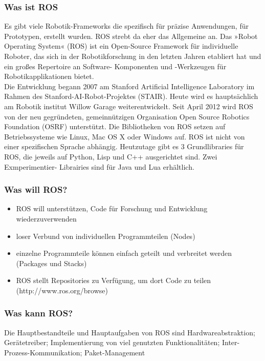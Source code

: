 \subsubsection{Was ist ROS}
Es gibt viele Robotik-Frameworks die spezifisch für präzise Anwendungen, für Prototypen,
erstellt wurden. ROS strebt da eher das Allgemeine an. Das »Robot Operating System«
(ROS) ist ein Open-Source Framework für individuelle Roboter, das sich in der
Robotikforschung in den letzten Jahren etabliert hat und ein großes Repertoire an Software-
Komponenten und -Werkzeugen für Robotikapplikationen bietet.\\
Die Entwicklung begann 2007 am Stanford Artificial Intelligence Laboratory im Rahmen des
Stanford-AI-Robot-Projektes (STAIR). Heute wird es hauptsächlich am Robotik institut Willow
Garage weiterentwickelt. Seit April 2012 wird ROS von der neu gegründeten,
gemeinnützigen Organisation Open Source Robotics Foundation (OSRF) unterstützt. Die
Bibliotheken von ROS setzen auf Betriebssysteme wie Linux, Mac OS X oder Windows auf.
ROS ist nicht von einer spezifischen Sprache abhängig. Heutzutage gibt es 3 Grundlibraries
für ROS, die jeweils auf Python, Lisp und C++ ausgerichtet sind. Zwei Exmperimentier-
Librairies sind für Java und Lua erhältlich.
\subsubsection{Was will ROS?}
\begin{itemize}
 \item ROS will unterstützen, Code für Forschung und Entwicklung wiederzuverwenden
 \item loser Verbund von individuellen Programmteilen (Nodes)
 \item einzelne Programmteile können einfach geteilt und verbreitet werden (Packages und Stacks)
 \item ROS stellt Repositories zu Verfügung, um dort Code zu teilen \cite{ROS:2014:Online}
(http://www.ros.org/browse)
\end{itemize}
\subsubsection{Was kann ROS?}
Die Hauptbestandteile und Hauptaufgaben von ROS sind Hardwareabstraktion; Gerätetreiber; Implementierung 
von viel genutzten Funktionalitäten; Inter-Prozess-Kommunikation; Paket-Management
